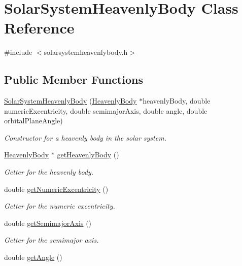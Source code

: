 \hypertarget{classSolarSystemHeavenlyBody}{
\section{\-Solar\-System\-Heavenly\-Body \-Class \-Reference}
\label{d9/dbe/classSolarSystemHeavenlyBody}
}


{\ttfamily \#include $<$solarsystemheavenlybody.\-h$>$}

\subsection*{\-Public \-Member \-Functions}
\begin{DoxyCompactItemize}
\item 
\hyperlink{classSolarSystemHeavenlyBody_a384412cc2adffbec84337aa361519fc6}{\-Solar\-System\-Heavenly\-Body} (\hyperlink{classHeavenlyBody}{\-Heavenly\-Body} $\ast$heavenly\-Body, double numeric\-Excentricity, double semimajor\-Axis, double angle, double orbital\-Plane\-Angle)
\begin{DoxyCompactList}\small\item\em \-Constructor for a heavenly body in the solar system. \end{DoxyCompactList}\item 
\hyperlink{classHeavenlyBody}{\-Heavenly\-Body} $\ast$ \hyperlink{classSolarSystemHeavenlyBody_af9c4f74bf3ea02dea8800cb013eaf878}{get\-Heavenly\-Body} ()
\begin{DoxyCompactList}\small\item\em \-Getter for the heavenly body. \end{DoxyCompactList}\item 
double \hyperlink{classSolarSystemHeavenlyBody_ada30a53ecb21376f2e1d16d372b273a4}{get\-Numeric\-Excentricity} ()
\begin{DoxyCompactList}\small\item\em \-Getter for the numeric excentricity. \end{DoxyCompactList}\item 
double \hyperlink{classSolarSystemHeavenlyBody_acdec4ef29103730c575c1f9ec33a8438}{get\-Semimajor\-Axis} ()
\begin{DoxyCompactList}\small\item\em \-Getter for the semimajor axis. \end{DoxyCompactList}\item 
double \hyperlink{classSolarSystemHeavenlyBody_a91dffb8bfe392257048bc689f13528ce}{get\-Angle} ()

\end{DoxyCompactItemize}
